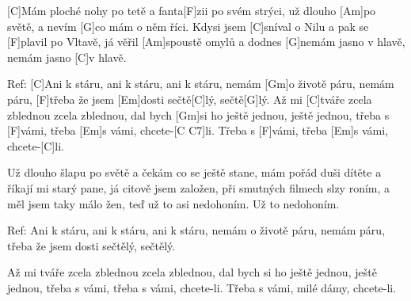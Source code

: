 
[C]Mám ploché nohy po tetě a fanta[F]zii po svém strýci,
už dlouho [Am] po světě, a nevím [G]co mám o něm říci.
Kdysi jsem [C]sníval o Nilu a pak se [F]plavil po Vltavě,
já věřil [Am]spoustě omylů a dodnes [G]nemám jasno v hlavě, nemám jasno [C]v hlavě.

Ref: [C]Ani k stáru, ani k stáru, ani k stáru,
nemám [Gm]o životě páru, nemám páru,
[F]třeba že jsem [Em]dosti sečtě[C]lý, sečtě[G]lý.
Až mi [C]tváře zcela zblednou zcela zblednou,
dal bych [Gm]si ho ještě jednou, ještě jednou,
třeba s [F]vámi, třeba [Em]s vámi, chcete-[C C7]li.
Třeba s [F]vámi, třeba [Em]s vámi, chcete-[C]li.

Už dlouho šlapu po světě a čekám co se ještě stane,
mám pořád duši dítěte a říkají mi starý pane,
já citově jsem založen, při smutných filmech slzy roním,
a měl jsem taky málo žen, teď už to asi nedohoním. Už to nedohoním.

Ref: Ani k stáru, ani k stáru, ani k stáru,
nemám o životě páru, nemám páru,
třeba že jsem dosti sečtělý, sečtělý.

Až mi tváře zcela zblednou zcela zblednou,
dal bych si ho ještě jednou, ještě jednou,
třeba s vámi, třeba s vámi, chcete-li.
Třeba s vámi, milé dámy, chcete-li.
